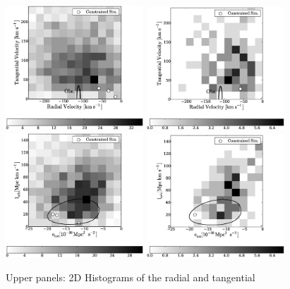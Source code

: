 \documentclass{emulateapj}
\begin{document}
\begin{figure}
\begin{center}
\includegraphics[keepaspectratio=true,width=0.46\textwidth]{fig_1a.eps}
\includegraphics[keepaspectratio=true,width=0.46\textwidth]{fig_1b.eps}
\includegraphics[keepaspectratio=true,width=0.46\textwidth]{fig_1c.eps}
\includegraphics[keepaspectratio=true,width=0.46\textwidth]{fig_1d.eps}
\caption{Upper panels: 2D Histograms of the radial and tangential
}
\end{center}
\end{figure}
\end{document}
